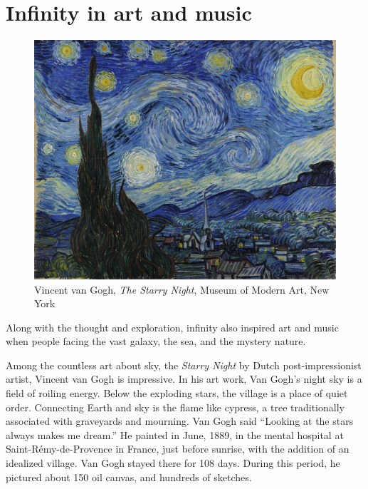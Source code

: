 \documentclass{article}
\begin{document}
\section{Infinity in art and music}

\begin{figure}[htbp]
 \centering
 \includegraphics[scale=0.15]{img/starry-night.jpg}
 \captionsetup{labelformat=empty}
 \caption{Vincent van Gogh, {\em The Starry Night}, Museum of Modern Art, New York}
 \label{fig:starry-night}
\end{figure}

Along with the thought and exploration, infinity also inspired art and music when people facing the vast galaxy, the sea, and the mystery nature.

Among the countless art about sky, the {\em Starry Night} by Dutch post-impressionist artist, Vincent van Gogh is impressive. In his art work, Van Gogh's night sky is a field of roiling energy. Below the exploding stars, the village is a place of quiet order. Connecting Earth and sky is the flame like cypress, a tree traditionally associated with graveyards and mourning. Van Gogh said ``Looking at the stars always makes me dream.'' He painted in June, 1889, in the mental hospital at Saint-Rémy-de-Provence in France, just before sunrise, with the addition of an idealized village. Van Gogh stayed there for 108 days. During this period, he pictured about 150 oil canvas, and hundreds of sketches.
\end{document}
